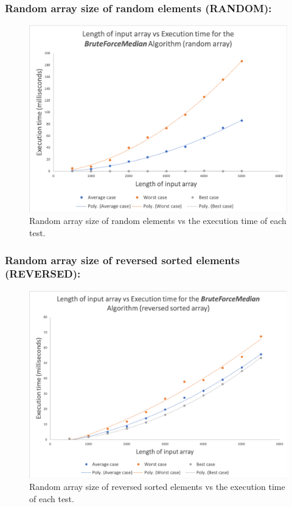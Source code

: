 \documentclass[12pt]{article}
\begin{document}
\subsubsection{Random array size of random elements (RANDOM): }
\begin{figure}[H]
	\centering
	\includegraphics[width=0.9\linewidth]{Results/TimeRandom}
	\caption{Random array size of random elements vs the execution time of each test.}
	\label{fig:timerandom}
\end{figure}

\subsubsection{Random array size of reversed sorted elements (REVERSED): }


\begin{figure}[H]
	\centering
	\includegraphics[width=0.9\linewidth]{Results/TimeReversed}
	\caption{Random array size of reversed sorted elements vs the execution time of each test.}
	\label{fig:timereversed}
\end{figure}
\end{document}
